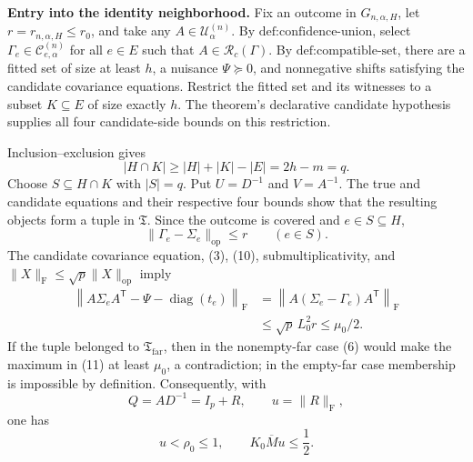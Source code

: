 \textbf{Entry into the identity neighborhood.}
Fix an outcome in \(G_{n,\alpha,H}\), let \(r=r_{n,\alpha,H}\leq r_0\), and take any \(A\in\mathcal U^{(n)}_\alpha\). By \(\text{def:confidence-union}\), select \(\Gamma_e\in\mathcal C^{(n)}_{e,\alpha}\) for all \(e\in E\) such that \(A\in\mathcal R_c(\Gamma)\). By \(\text{def:compatible-set}\), there are a fitted set of size at least \(h\), a nuisance \(\Psi\succeq0\), and nonnegative shifts satisfying the candidate covariance equations. Restrict the fitted set and its witnesses to a subset \(K\subseteq E\) of size exactly \(h\). The theorem's declarative candidate hypothesis supplies all four candidate-side bounds on this restriction.

Inclusion--exclusion gives
\[
|H\cap K|\geq|H|+|K|-|E|=2h-m=q.
\]
Choose \(S\subseteq H\cap K\) with \(|S|=q\). Put \(U=D^{-1}\) and \(V=A^{-1}\). The true and candidate equations and their respective four bounds show that the resulting objects form a tuple in \(\mathfrak T\). Since the outcome is covered and \(e\in S\subseteq H\),
\[
\|\Gamma_e-\Sigma_e\|_{\mathrm{op}}\leq r
\qquad(e\in S).
\tag{10}
\]
The candidate covariance equation, (3), (10), submultiplicativity, and \(\|X\|_{\mathrm F}\leq\sqrt p\|X\|_{\mathrm{op}}\) imply
\[
\begin{aligned}
\left\|A\Sigma_eA^{\mathsf T}
-\Psi-\operatorname{diag}(t_e)\right\|_{\mathrm F}
&=\left\|A(\Sigma_e-\Gamma_e)A^{\mathsf T}\right\|_{\mathrm F}\\
&\leq\sqrt p\,L_0^2r
\leq\mu_0/2.
\end{aligned}
\tag{11}
\]
If the tuple belonged to \(\mathfrak T_{\mathrm{far}}\), then in the nonempty-far case (6) would make the maximum in (11) at least \(\mu_0\), a contradiction; in the empty-far case membership is impossible by definition. Consequently, with
\[
Q=AD^{-1}=I_p+R,
\qquad u=\|R\|_{\mathrm F},
\]
one has
\[
u<\rho_0\leq1,
\qquad K_0\overline M u\leq\frac12.
\tag{12}
\]

